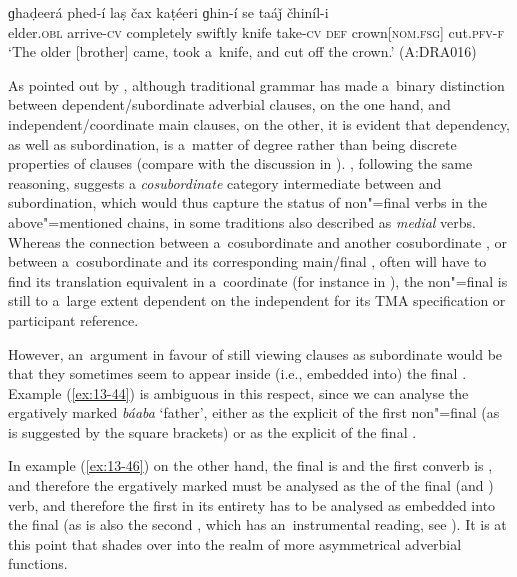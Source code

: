 \ex
\label{ex:13-46}
\gll ɡhaḍeerá {\ob}phed-í{\cb} {\ob}laṣ čax kaṭéeri ɡhin-í{\cb} se taáǰ čhiníl-i \\
elder.\textsc{obl} arrive-\textsc{cv} completely swiftly knife take-\textsc{cv}  \textsc{def} crown[\textsc{nom.fsg}] cut.\textsc{pfv-f}\\
\glt `The older [brother] came, took a~knife, and cut off the crown.' (A:DRA016) 
\z

As pointed out by \citet[327-8]{givon2001b}, although traditional grammar has made a~binary distinction between dependent/subordinate adverbial clauses, on the one hand, and independent/coordinate main clauses, on the other, it is evident that dependency, as well as subordination, is a~matter of degree rather than being discrete properties of clauses (compare with the discussion in \citet[]{cristofaro2005}). \citet[20--27]{haspelmath1995}, following the same reasoning, suggests a \textit{cosubordinate} category intermediate between  and subordination, which would thus capture the status of non"=final verbs in the above"=mentioned chains, in some traditions also described as \textit{medial} verbs. Whereas the connection between a~cosubordinate  and another cosubordinate , or between a~cosubordinate  and its corresponding main/final , often will have to find its translation equivalent in a~coordinate  (for instance in \iliEnglish), the non"=final  is still to a~large extent dependent on the independent  for its TMA specification or participant reference.



However, an~argument in favour of still viewing  clauses as subordinate would be that they sometimes seem to appear inside (i.e., embedded into) the final . Example (\ref{ex:13-44}) is ambiguous in this respect, since we can analyse the ergatively marked \textit{báaba} `father', either as the explicit  of the first non"=final   (as is suggested by the square brackets) or as the explicit  of the final  . 



In example (\ref{ex:13-46}) on the other hand, the final  is  and the first converb is , and therefore the ergatively marked  must be analysed as the  of the final (and ) verb, and therefore the first   in its entirety has to be analysed as embedded into the final  (as is also the second  , which has an~instrumental reading, see ). It is at this point that  shades over into the realm of more asymmetrical adverbial functions. 



